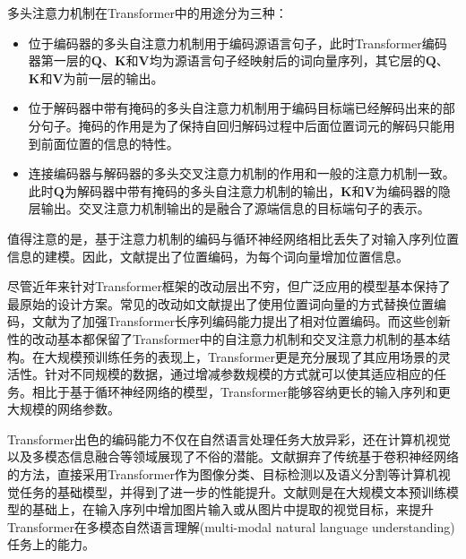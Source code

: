 多头注意力机制在Transformer中的用途分为三种：
\begin{itemize}
    \item 位于编码器的多头自注意力机制用于编码源语言句子，此时Transformer编码器第一层的$\boldsymbol{Q}$、$\boldsymbol{K}$和$\boldsymbol{V}$均为源语言句子经映射后的词向量序列，其它层的$\boldsymbol{Q}$、$\boldsymbol{K}$和$\boldsymbol{V}$为前一层的输出。
    \item 位于解码器中带有掩码的多头自注意力机制用于编码目标端已经解码出来的部分句子。掩码的作用是为了保持自回归解码过程中后面位置词元的解码只能用到前面位置的信息的特性。
    \item 连接编码器与解码器的多头交叉注意力机制的作用和一般的注意力机制一致。此时$\boldsymbol{Q}$为解码器中带有掩码的多头自注意力机制的输出，$\boldsymbol{K}$和$\boldsymbol{V}$为编码器的隐层输出。交叉注意力机制输出的是融合了源端信息的目标端句子的表示。
\end{itemize}
值得注意的是，基于注意力机制的编码与循环神经网络相比丢失了对输入序列位置信息的建模。因此，文献\cite{5_DBLP:journals/corr/VaswaniSPUJGKP17}提出了位置编码，为每个词向量增加位置信息。%

尽管近年来针对Transformer框架的改动层出不穷，但广泛应用的模型基本保持了最原始的设计方案。常见的改动如文献\cite{7_DBLP:conf/naacl/DevlinCLT19}提出了使用位置词向量的方式替换位置编码，文献\cite{8_DBLP:journals/corr/abs-1803-02155,9_DBLP:journals/corr/abs-1901-02860}为了加强Transformer长序列编码能力提出了相对位置编码。而这些创新性的改动基本都保留了Transformer中的自注意力机制和交叉注意力机制的基本结构。在大规模预训练任务的表现上，Transformer更是充分展现了其应用场景的灵活性。针对不同规模的数据，通过增减参数规模的方式就可以使其适应相应的任务。相比于基于循环神经网络的模型，Transformer能够容纳更长的输入序列和更大规模的网络参数。

Transformer出色的编码能力不仅在自然语言处理任务大放异彩，还在计算机视觉以及多模态信息融合等领域展现了不俗的潜能。文献\cite{10_DBLP:journals/corr/abs-1802-05751,11_DBLP:conf/iclr/DosovitskiyB0WZ21,12_DBLP:conf/iccv/LiuL00W0LG21,13_DBLP:conf/iccv/0007CWYSJTFY21}摒弃了传统基于卷积神经网络的方法，直接采用Transformer作为图像分类、目标检测以及语义分割等计算机视觉任务的基础模型，并得到了进一步的性能提升。文献\cite{14_DBLP:conf/nips/LuBPL19,15_DBLP:conf/eccv/ChenLYK0G0020,16_DBLP:journals/corr/abs-2004-00849,17_DBLP:conf/icml/KimSK21}则是在大规模文本预训练模型的基础上，在输入序列中增加图片输入或从图片中提取的视觉目标，来提升Transformer在多模态自然语言理解(multi-modal natural language understanding)任务上的能力。

